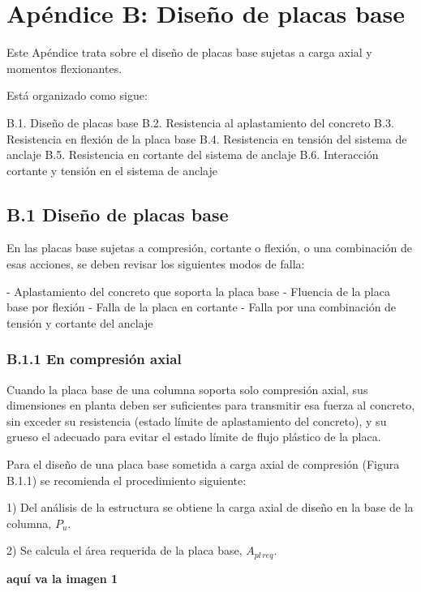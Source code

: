 \chapter{Apéndice B: Diseño de placas base}

Este Apéndice trata sobre el diseño de placas base sujetas a carga axial y momentos flexionantes.

Está organizado como sigue:

B.1. Diseño de placas base
B.2. Resistencia al aplastamiento del concreto
B.3. Resistencia en flexión de la placa base
B.4. Resistencia en tensión del sistema de anclaje
B.5. Resistencia en cortante del sistema de anclaje
B.6. Interacción cortante y tensión en el sistema de anclaje

\section*{B.1 Diseño de placas base}

En las placas base sujetas a compresión, cortante o flexión, o una combinación de esas acciones, se deben revisar los siguientes modos de falla:

- Aplastamiento del concreto que soporta la placa base
- Fluencia de la placa base por flexión
- Falla de la placa en cortante
- Falla por una combinación de tensión y cortante del anclaje

\subsection*{B.1.1 En compresión axial}

Cuando la placa base de una columna soporta solo compresión axial, sus dimensiones en planta deben ser suficientes para transmitir esa fuerza al concreto, sin exceder su resistencia (estado límite de aplastamiento del concreto), y su grueso el adecuado para evitar el estado límite de flujo plástico de la placa.

Para el diseño de una placa base sometida a carga axial de compresión (Figura B.1.1) se recomienda el procedimiento siguiente:

1) Del análisis de la estructura se obtiene la carga axial de diseño en la base de la columna, $P_u$.

2) Se calcula el área requerida de la placa base, $A_{pl\,req}$.

\begin{center}
\textbf{aquí va la imagen 1}
\end{center}

